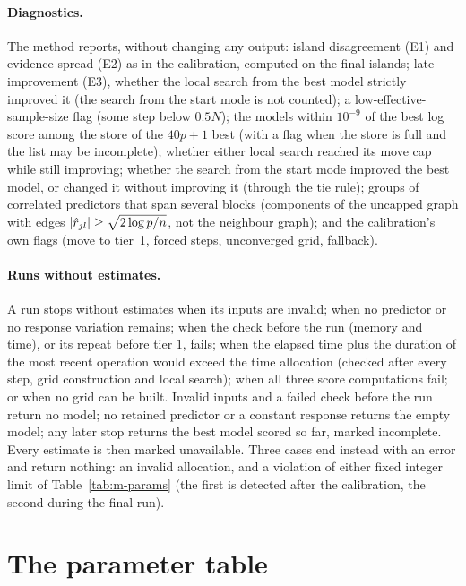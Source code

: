 \documentclass[11pt]{article}
\begin{document}
\paragraph{Diagnostics.} The method reports, without changing any output: island disagreement (E1) and evidence spread
(E2) as in the calibration, computed on the final islands; late improvement (E3), whether the local search from the best
model strictly improved it (the search from the start mode is not counted); a low-effective-sample-size flag (some step
below $0.5N$); the models within $10^{-9}$ of the best log score among the store of the $40p+1$ best (with a flag when the store is full
and the list may be incomplete); whether either local search reached its move cap while
still improving; whether the search from the start mode improved the best model, or changed it without improving it (through the tie
rule); groups of correlated
predictors that span several blocks (components of the uncapped graph with edges $\lvert \hat r_{jl}\rvert\ge\sqrt{2\log p/n}$,
not the neighbour graph); and the calibration's
own flags (move to tier~1, forced steps, unconverged grid, fallback).

\paragraph{Runs without estimates.} A run stops without estimates when its inputs are invalid; when no predictor or no
response variation remains; when the check before the run (memory and time), or its repeat before tier $1$, fails; when
the elapsed time plus the duration of the most recent operation would exceed the time allocation (checked after every
step, grid construction and local search); when all three score computations fail; or when no grid can be built.
Invalid inputs and a failed check before the run return no model; no retained predictor or a constant response returns
the empty model; any later stop returns the best model scored so far, marked incomplete. Every estimate is then marked
unavailable. Three cases end instead with an error and return nothing: an invalid allocation, and a violation of either
fixed integer limit of Table~\ref{tab:m-params} (the first is detected after the calibration, the second during the final
run).

\section{The parameter table}\label{sec:m-table}
\end{document}
